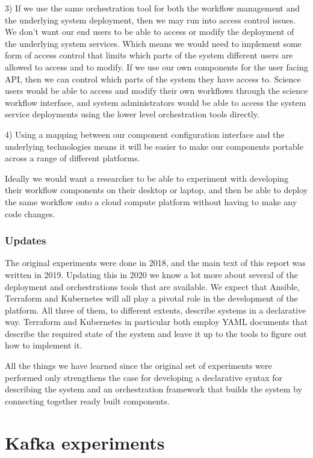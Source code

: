 \documentclass{article}
\newcommand{\ansible} {Ansible\xspace}
\newcommand{\terraform} {Terraform\xspace}
\newcommand{\kubernetes} {Kubernetes\xspace}
\begin{document}
3) If we use the same orchestration tool for both the workflow management and the underlying system deployment, then we may run into access control issues.
We don't want our end users to be able to access or modify the deployment of the underlying system services. Which means we would need to implement some form of access control that limits which parts of the system different users are allowed to access and to modify.
If we use our own components for the user facing API, then we can control which parts of the system they have access to. Science users would be able to access and modify their own workflows through the science workflow interface, and system administrators would be able to access the system service deployments using the lower level orchestration tools directly.

4) Using a mapping between our component configuration interface and the underlying technologies means it will be easier to make our components portable across a range of different platforms.

Ideally we would want a researcher to be able to experiment with developing their workflow components on their desktop or laptop, and then be able to deploy the same workflow onto a cloud compute platform without having to make any code changes.

\subsubsection{Updates}
\label{workflow.updates}

The original experiments were done in 2018, and the main text of this report was written in 2019. 
Updating this in 2020 we know a lot more about several of the deployment and orchestrations tools that are available.
We expect that \ansible, \terraform and \kubernetes will all play a pivotal role in the development of the platform.
All three of them, to different extents, describe systems in a declarative way.
\terraform and \kubernetes in particular both employ YAML documents that describe the required state of the system and leave it up to the tools to figure out how to implement it.

All the things we have learned since the original set of experiments were performed only strengthens the case for developing a declarative syntax for describing the system and an orchestration framework that builds the system by connecting together ready built components.

\section{Kafka experiments}
\label{kafka-compendium}
\end{document}
